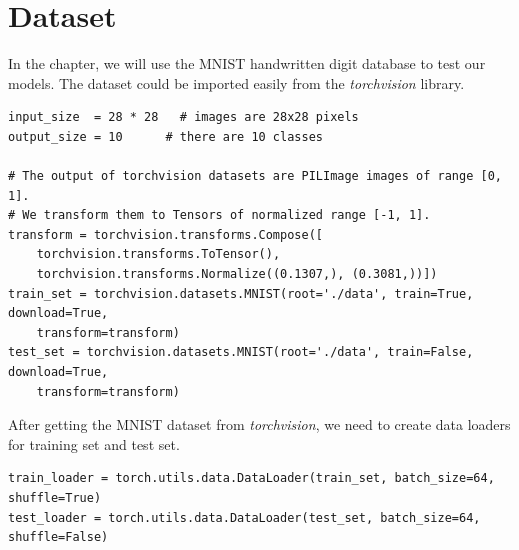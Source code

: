     \section{Dataset}
    In the chapter, we will use the MNIST handwritten digit database to test our models.
    The dataset could be imported easily from the \emph{torchvision} library.
    \begin{verbatim}
input_size  = 28 * 28   # images are 28x28 pixels
output_size = 10      # there are 10 classes

# The output of torchvision datasets are PILImage images of range [0, 1].
# We transform them to Tensors of normalized range [-1, 1].
transform = torchvision.transforms.Compose([
    torchvision.transforms.ToTensor(),
    torchvision.transforms.Normalize((0.1307,), (0.3081,))])
train_set = torchvision.datasets.MNIST(root='./data', train=True, download=True, 
    transform=transform)
test_set = torchvision.datasets.MNIST(root='./data', train=False, download=True,
    transform=transform)
    \end{verbatim}
    After getting the MNIST dataset from \emph{torchvision}, we need to create data loaders for training set and test set.
    \begin{verbatim} 
train_loader = torch.utils.data.DataLoader(train_set, batch_size=64, shuffle=True)
test_loader = torch.utils.data.DataLoader(test_set, batch_size=64, shuffle=False)
    \end{verbatim}
    
